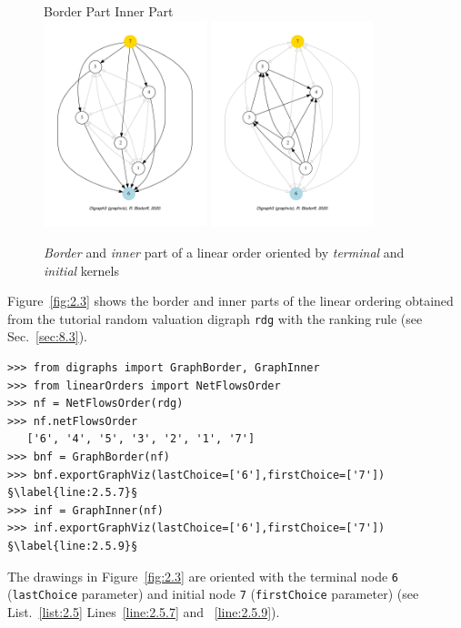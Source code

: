 \begin{figure}[ht]
  Border Part \hfill Inner Part \\
  \includegraphics[height=6cm]{Figures/2-3-linearOrderBorder.pdf}\hfill
  \includegraphics[height=6cm]{Figures/2-3-linearOrderInner.pdf}\hfill
\caption{\emph{Border} and \emph{inner} part of a linear order oriented by \emph{terminal} and \emph{initial} kernels}
\label{fig:2.3}       %
\end{figure}
Figure~\vref{fig:2.3} shows the border and inner parts of the linear ordering obtained from the tutorial random valuation digraph \texttt{rdg}  with the \NetFlows ranking rule  (see Sec.~\ref{sec:8.3}).  
\begin{lstlisting}[caption={Border and inner part of a linear order},label=list:2.5]
>>> from digraphs import GraphBorder, GraphInner
>>> from linearOrders import NetFlowsOrder
>>> nf = NetFlowsOrder(rdg)
>>> nf.netFlowsOrder
   ['6', '4', '5', '3', '2', '1', '7']
>>> bnf = GraphBorder(nf)
>>> bnf.exportGraphViz(lastChoice=['6'],firstChoice=['7']) §\label{line:2.5.7}§
>>> inf = GraphInner(nf)
>>> inf.exportGraphViz(lastChoice=['6'],firstChoice=['7']) §\label{line:2.5.9}§
\end{lstlisting}

The drawings in Figure~\vref{fig:2.3} are oriented with the terminal node \texttt{6} (\texttt{lastChoice} parameter) and initial node \texttt{7} (\texttt{firstChoice} parameter) (see List.~\vref{list:2.5} Lines~\ref{line:2.5.7} and ~\ref{line:2.5.9}).

